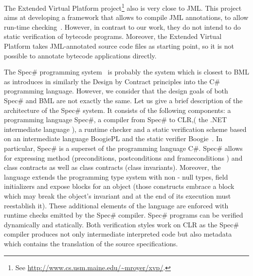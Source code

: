 
The Extended Virtual Platform project\footnote{See \url{http://www.cs.usm.maine.edu/~mroyer/xvp/}.} also is very close to JML.
 This project aims at developing a framework that allows to compile JML annotations, to
allow run-time checking~\cite{AlagicXVP05}. However, in contrast to
our work, they do not intend to do static verification of bytecode
programs. Moreover, the Extended Virtual Platform takes JML-annotated source code
files as starting point, so it is not possible to annotate bytecode
applications directly.

The Spec\# programming system~\cite{BLS04sp} is probably the system which is closest to BML as  
introduces in similarly the Design by Contract principles into the C\#
programming language. However, we consider that the design goals of both Spec\# and BML 
are not exactly the same.
 Let us give a brief description of the architecture of the  Spec\# system. %
 It consists of the following components:  a programming language Spec\#, a compiler from Spec\# to 
 CLR,( the .NET intermediate language  \cite{B02EN}), a runtime checker and a static verification scheme
 based on an intermediate language BoogiePL and the static verifier Boogie~\cite{BarnettCDJL05}.
 In particular, Spec\# is a superset of the programming language  C\#. Spec\# allows for expressing method (preconditions, postconditions and frameconditions )
 and class contracts as well as class contracts (class invariants). Moreover, the language extends the programming type system with non - null types,
 field initializers and expose blocks for an object (those constructs embrace a  block which  may break the object's invariant and at the end of its execution must reestablish it).
 These additional elements of the language are enforced with runtime checks emitted by the Spec\# compiler. 
  Spec\# programs can be verified dynamically and statically. 
 Both verification styles work on  CLR as the Spec\# compiler produces not only intermediate interpreted code but also metadata which contains 
 the translation of the source specifications. %
